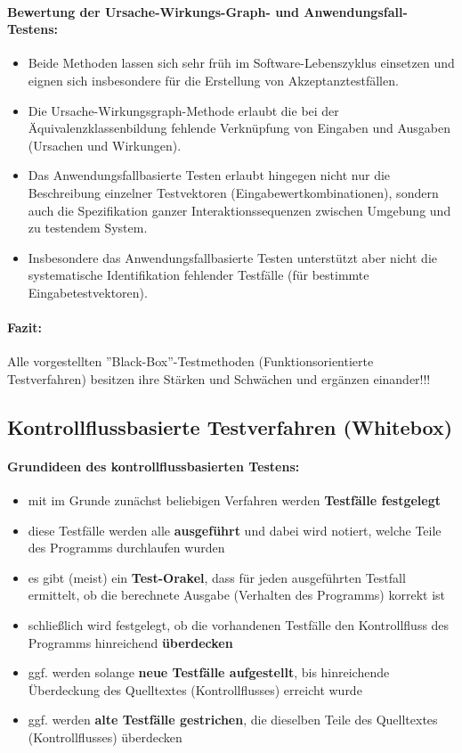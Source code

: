 \paragraph{Bewertung der Ursache-Wirkungs-Graph- und Anwendungsfall-Testens:}
\begin{itemize}
	\item Beide Methoden lassen sich sehr früh im Software-Lebenszyklus einsetzen und eignen sich insbesondere für die Erstellung von Akzeptanztestfällen.
	\item Die Ursache-Wirkungsgraph-Methode erlaubt die bei der Äquivalenzklassenbildung fehlende Verknüpfung von Eingaben und Ausgaben (Ursachen und Wirkungen).
	\item Das Anwendungsfallbasierte Testen erlaubt hingegen nicht nur die Beschreibung einzelner Testvektoren (Eingabewertkombinationen), sondern auch die Spezifikation ganzer Interaktionssequenzen zwischen Umgebung und zu testendem System.
	\item Insbesondere das Anwendungsfallbasierte Testen unterstützt aber nicht die systematische Identifikation fehlender Testfälle (für bestimmte Eingabetestvektoren).
\end{itemize}

\paragraph{Fazit:}
Alle vorgestellten ''Black-Box''-Testmethoden (Funktionsorientierte Testverfahren) besitzen ihre Stärken und Schwächen und ergänzen einander!!!

\subsection{Kontrollflussbasierte Testverfahren (Whitebox)}

\paragraph{Grundideen des kontrollflussbasierten Testens:}
\begin{itemize}
	\item mit im Grunde zunächst beliebigen Verfahren werden \textbf{Testfälle festgelegt}
	\item diese Testfälle werden alle \textbf{ausgeführt} und dabei wird notiert, welche Teile des Programms durchlaufen wurden
	\item es gibt (meist) ein \textbf{Test-Orakel}, dass für jeden ausgeführten Testfall ermittelt, ob die berechnete Ausgabe (Verhalten des Programms) korrekt ist
	\item schließlich wird festgelegt, ob die vorhandenen Testfälle den Kontrollfluss des Programms hinreichend \textbf{überdecken}
	\item ggf. werden solange \textbf{neue Testfälle aufgestellt}, bis hinreichende Überdeckung des Quelltextes (Kontrollflusses) erreicht wurde
	\item ggf. werden \textbf{alte Testfälle gestrichen}, die dieselben Teile des Quelltextes (Kontrollflusses) überdecken
\end{itemize}

